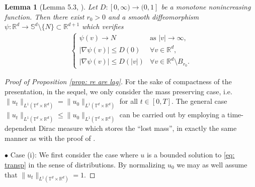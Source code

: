 \documentclass[11pt,reqno,a4paper]{amsart}
\newcommand{\R}{\mathbb{R}}
\newtheorem{lemma}{Lemma}[section]
\theoremstyle{definition}
\theoremstyle{remark}
\numberwithin{equation}{section}
\newcommand{\T} {\mathbb T}
\newcommand{\bbS}{\mathbb S}
\begin{document}
\begin{lemma}[Lemma 5.3, \cite{ambrosiocolombofigalli2017}] \label{lem: psi}
    Let $D:[0,\infty)\to (0,1]$ be a monotone nonincreasing function. Then there exist $r_0>0$ and a smooth diffeomorphism $\psi:\R^d\to \bbS^d\setminus\{N\} \subset \R^{d+1}$ which verifies
    \begin{align*}
        \begin{cases}
        \psi(v) \to N &\text{as }|v|\to\infty,\\
        |\nabla \psi(v)| \le D(0) & \forall v\in \R^d,\\
        |\nabla \psi(v)| \le D(|v|) & \forall v\in \R^d\setminus B_{r_0}.
        \end{cases}
    \end{align*}
\end{lemma}
\begin{proof}[Proof of Proposition \ref{prop: re are lag}]
For the sake of compactness of the presentation, in the sequel, we only consider the mass preserving case, i.e. $\|u_t\|_{L^1(\T^d \times \R^d)} = \|u_0\|_{L^1(\T^d \times \R^d)}$ for all $t \in [0,T]$. The general case $\|u_t\|_{L^1(\T^d \times \R^d)} \le \|u_0\|_{L^1(\T^d \times \R^d)}$ can be carried out by employing a time-dependent Dirac measure which stores the ``lost mass'', in exactly the same manner as with the proof of \cite[Theorem 5.1]{ambrosiocolombofigalli2017}.

$\bullet$ Case (i): We first consider the case where $u$ is a bounded solution to \eqref{eq: transp} in the sense of distributions. By normalizing $u_0$ we may as well assume that $\|u_t\|_{L^1(\T^d\times\R^d)} = 1$.
 

\end{proof}
\end{document}
